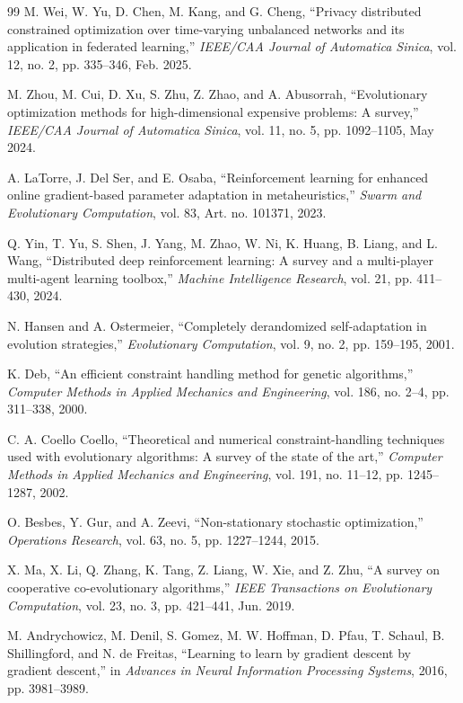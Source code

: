 \documentclass[conference]{IEEEtran}
\begin{document}
\begin{thebibliography}{99}
 M. Wei, W. Yu, D. Chen, M. Kang, and G. Cheng, ``Privacy distributed constrained optimization over time-varying unbalanced networks and its application in federated learning,'' \emph{IEEE/CAA Journal of Automatica Sinica}, vol. 12, no. 2, pp. 335--346, Feb. 2025.

 M. Zhou, M. Cui, D. Xu, S. Zhu, Z. Zhao, and A. Abusorrah, ``Evolutionary optimization methods for high-dimensional expensive problems: A survey,'' \emph{IEEE/CAA Journal of Automatica Sinica}, vol. 11, no. 5, pp. 1092--1105, May 2024.

 A. LaTorre, J. Del Ser, and E. Osaba, ``Reinforcement learning for enhanced online gradient-based parameter adaptation in metaheuristics,'' \emph{Swarm and Evolutionary Computation}, vol. 83, Art. no. 101371, 2023.

 Q. Yin, T. Yu, S. Shen, J. Yang, M. Zhao, W. Ni, K. Huang, B. Liang, and L. Wang, ``Distributed deep reinforcement learning: A survey and a multi-player multi-agent learning toolbox,'' \emph{Machine Intelligence Research}, vol. 21, pp. 411--430, 2024.

 N. Hansen and A. Ostermeier, ``Completely derandomized self-adaptation in evolution strategies,'' \emph{Evolutionary Computation}, vol. 9, no. 2, pp. 159--195, 2001.

 K. Deb, ``An efficient constraint handling method for genetic algorithms,'' \emph{Computer Methods in Applied Mechanics and Engineering}, vol. 186, no. 2--4, pp. 311--338, 2000.

 C. A. Coello Coello, ``Theoretical and numerical constraint-handling techniques used with evolutionary algorithms: A survey of the state of the art,'' \emph{Computer Methods in Applied Mechanics and Engineering}, vol. 191, no. 11--12, pp. 1245--1287, 2002.

 O. Besbes, Y. Gur, and A. Zeevi, ``Non-stationary stochastic optimization,'' \emph{Operations Research}, vol. 63, no. 5, pp. 1227--1244, 2015.

 X. Ma, X. Li, Q. Zhang, K. Tang, Z. Liang, W. Xie, and Z. Zhu, ``A survey on cooperative co-evolutionary algorithms,'' \emph{IEEE Transactions on Evolutionary Computation}, vol. 23, no. 3, pp. 421--441, Jun. 2019.

 M. Andrychowicz, M. Denil, S. Gomez, M. W. Hoffman, D. Pfau, T. Schaul, B. Shillingford, and N. de Freitas, ``Learning to learn by gradient descent by gradient descent,'' in \emph{Advances in Neural Information Processing Systems}, 2016, pp. 3981--3989.


\end{thebibliography}
\end{document}
